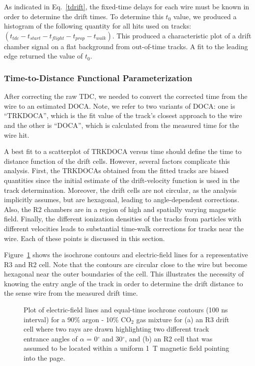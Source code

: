 As indicated in Eq.~\ref{tdrift}, the fixed-time delays 
for each wire must be known in order to determine the drift times.   To determine
this $t_0$ value, we produced a histogram of the following quantity for all hits
used on tracks:~$ ( t_{tdc} - t_{start} - t_{flight} - t_{prop} - t_{walk} )$.
This produced a characteristic plot of a drift chamber signal on a flat
background from out-of-time tracks.  
A fit to the leading edge returned the value of $t_0$.

\subsubsection{Time-to-Distance Functional Parameterization}
\label{tdistcal}

After correcting the raw TDC, we needed to convert the corrected time from
the wire to an estimated DOCA.
Note, we refer to two variants of DOCA: one is ``TRKDOCA'', which is the
fit value of the track's closest approach to the wire and the other is ``DOCA'',
which is calculated from the measured time for the wire hit.
 
A best fit to a scatterplot of TRKDOCA versus time should define the time to
distance function of the drift cells. However, several factors 
complicate this analysis. First, the TRKDOCAs obtained from the fitted 
tracks are biased quantities since the initial estimate of the drift-velocity function 
is used in the track determination.  Moreover, the drift cells are 
not circular, as the analysis implicitly assumes, but are hexagonal, leading 
to angle-dependent corrections. Also, the R2 chambers are in a 
region of high and spatially varying magnetic field. Finally, the different 
ionization densities of the tracks from particles with different velocities 
leads to substantial time-walk corrections for tracks near the wire.  Each of 
these points is discussed in this section.

Figure~\ref{garfield-isochrones} shows the isochrone contours and electric-field lines for 
a representative R3 and R2 cell.  Note that the contours are circular close 
to the wire but become hexagonal near the outer boundaries of the cell.  This 
illustrates the necessity of knowing the entry angle of the track in order to 
determine the drift distance to the sense wire from the measured drift time.

\begin{figure}[htpb]
\vspace{6.5cm} 
\caption{\small{Plot of electric-field lines and equal-time isochrone contours
(100 ns interval) for a 90$\%$ argon - 10$\%$ CO$_2$ gas mixture for (a) an R3
drift cell where two rays are drawn highlighting two different track entrance 
angles of $\alpha$ = 0$^{\circ}$ and 30$^{\circ}$, and (b) an R2 cell that 
was assumed to be located within a uniform 1~T magnetic field pointing into the page.}}
\label{garfield-isochrones}
\end{figure}

